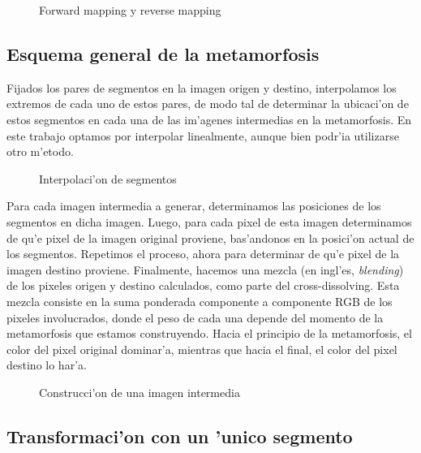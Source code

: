 \begin{figure}[H]
	\begin{center}
	\end{center}		
	\caption{Forward mapping y reverse mapping}
	\label{fig4}
\end{figure}

\subsection{Esquema general de la metamorfosis}

Fijados los pares de segmentos en la imagen origen y destino, interpolamos los extremos de cada uno de estos pares, de modo tal de determinar la ubicaci'on de estos segmentos en cada una de las im'agenes intermedias en la metamorfosis. En este trabajo optamos por interpolar linealmente, aunque bien podr'ia utilizarse otro m'etodo.

\begin{figure}[H]
	\begin{center}
	\end{center}		
	\caption{Interpolaci'on de segmentos}
	\label{fig5}
\end{figure}

Para cada imagen intermedia a generar, determinamos las posiciones de los segmentos en dicha imagen. Luego, para cada pixel de esta imagen determinamos de qu'e pixel de la imagen original proviene, bas'andonos en la posici'on actual de los segmentos. Repetimos el proceso, ahora para determinar de qu'e pixel de la imagen destino proviene. Finalmente, hacemos una mezcla (en ingl'es, \textit{blending}) de los pixeles origen y destino calculados, como parte del cross-dissolving. Esta mezcla consiste en la suma ponderada componente a componente RGB de los pixeles involucrados, donde el peso de cada una depende del momento de la metamorfosis que estamos construyendo. Hacia el principio de la metamorfosis, el color del pixel original dominar'a, mientras que hacia el final, el color del pixel destino lo har'a.

\begin{figure}[H]
	\begin{center}
	\end{center}		
	\caption{Construcci'on de una imagen intermedia}
	\label{fig6}
\end{figure}

\subsection{Transformaci'on con un 'unico segmento}

